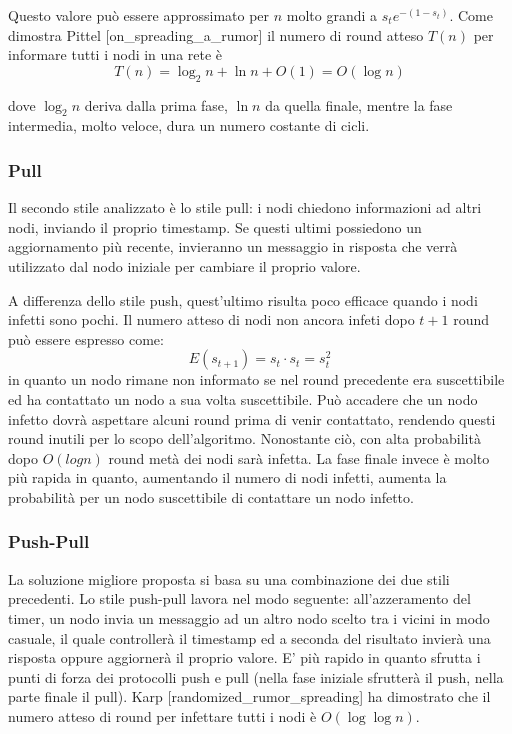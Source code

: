 Questo valore può essere approssimato per $n$ molto grandi a $s_t e^{-(1-s_t)}$. Come dimostra Pittel [on\_spreading\_a\_rumor] il numero di round atteso $T(n)$ per informare tutti i nodi in una rete è
\begin{equation}
    T(n)= \log_2 n + \ln n + O(1) = O(\log n)
\end{equation}

dove $\log_2 n$ deriva dalla prima fase, $\ln n$ da quella finale, mentre la fase intermedia, molto veloce, dura un numero costante di cicli.
\subsubsection{Pull}
Il secondo stile analizzato è lo stile pull: i nodi chiedono informazioni ad altri nodi, inviando il proprio timestamp. Se questi ultimi possiedono un aggiornamento più recente, invieranno un messaggio in risposta che verrà utilizzato dal nodo iniziale per cambiare il proprio valore.

A differenza dello stile push, quest'ultimo risulta poco efficace quando i nodi infetti sono pochi. Il numero atteso di nodi non ancora infeti dopo $t+1$ round può essere espresso come:
\begin{equation}
    E(s_{t+1}) = s_t \cdot s_t = s_t^2
\end{equation}
in quanto un nodo rimane non informato se nel round precedente era suscettibile ed ha contattato un nodo a sua volta suscettibile. Può accadere che un nodo infetto dovrà aspettare alcuni round prima di venir contattato, rendendo questi round inutili per lo scopo dell'algoritmo. Nonostante ciò, con alta probabilità dopo $O(log n)$ round metà dei nodi sarà infetta. La fase finale invece è molto più rapida in quanto, aumentando il numero di nodi infetti, aumenta la probabilità per un nodo suscettibile di contattare un nodo infetto.
\subsubsection{Push-Pull}
La soluzione migliore proposta si basa su una combinazione dei due stili precedenti. Lo stile push-pull lavora nel modo seguente: all’azzeramento del timer, un nodo invia un messaggio ad un altro nodo scelto tra i vicini in modo casuale, il quale controllerà il timestamp ed a seconda del risultato invierà una risposta oppure aggiornerà il proprio valore. E’ più rapido in quanto sfrutta i punti di forza dei protocolli push e pull (nella fase iniziale sfrutterà il push, nella parte finale il pull). Karp [randomized\_rumor\_spreading] ha dimostrato che il numero atteso di round per infettare tutti i nodi è $O(\log\log n)$.

